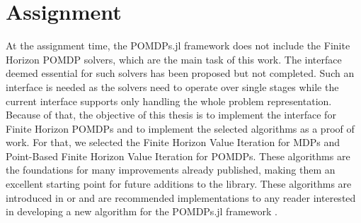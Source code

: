 



\section{Assignment}
At the assignment time, the POMDPs.jl framework does not include the Finite Horizon POMDP solvers, which are the main task of this work. The interface deemed essential for such solvers has been proposed but not completed. Such an interface is needed as the solvers need to operate over single stages while the current interface supports only handling the whole problem representation. Because of that, the objective of this thesis is to implement the interface for Finite Horizon POMDPs and to implement the selected algorithms as a proof of work. For that, we selected the Finite Horizon Value Iteration for MDPs and Point-Based Finite Horizon Value Iteration for POMDPs. These algorithms are the foundations for many improvements already published, making them an excellent starting point for future additions to the library. These algorithms are introduced in \cite{Walraven19} or \cite{Shani2013} and are recommended implementations to any reader interested in developing a new algorithm for the POMDPs.jl framework .

